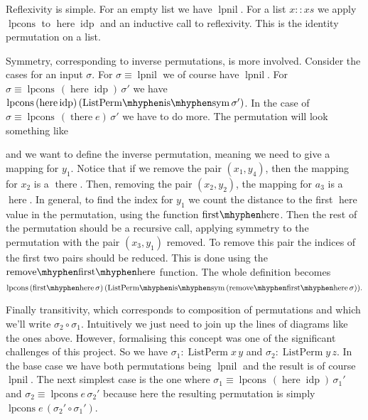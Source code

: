 \documentclass[12pt, parskip, DIV=14]{scrbook}
\renewcommand{\circ}{\vysmwhtcircle}
\newcommand{\idp}{\operatorname{idp}}
\newcommand{\here}{\operatorname{here}}
\newcommand{\there}{\operatorname{there}}
\newcommand{\firsthere}{\operatorname{first\mhyphen here}}
\newcommand{\remfirsthere}{\operatorname{remove\mhyphen first\mhyphen here}}
\newcommand{\ListPerm}{\operatorname{ListPerm}}
\newcommand{\lpnil}{\operatorname{lpnil}}
\newcommand{\lpcons}{\operatorname{lpcons}}
\begin{document}
Reflexivity is simple. For an empty list we have $\lpnil$. For a list $x :: xs$ we apply $\lpcons$ to $\here \idp$ and an inductive call to reflexivity. This is the identity permutation on a list.

Symmetry, corresponding to inverse permutations, is more involved. Consider the cases for an input $\sigma$. For $\sigma \equiv \lpnil$ we of course have $\lpnil$. For $\sigma \equiv \lpcons\,(\here \idp)\,\sigma'$ we have $\lpcons\,(\here \idp)\,(\mathrm{ListPerm\mhyphen is\mhyphen sym}\,\sigma')$. In the case of $\sigma \equiv \lpcons\,(\there e)\,\sigma'$ we have to do more. The permutation will look something like
\begin{center}
\end{center}
and we want to define the inverse permutation, meaning we need to give a mapping for $y_1$. Notice that if we remove the pair $(x_1 , y_4)$, then the mapping for $x_2$ is a $\there$. Then, removing the pair $(x_2 , y_2)$, the mapping for $a_3$ is a $\here$. In general, to find the index for $y_1$ we count the distance to the first $\here$ value in the permutation, using the function $\firsthere$. Then the rest of the permutation should be a recursive call, applying symmetry to the permutation with the pair $(x_3 , y_1)$ removed. To remove this pair the indices of the first two pairs should be reduced. This is done using the $\remfirsthere$ function. The whole definition becomes $$\lpcons\,(\firsthere \sigma)\,(\mathrm{ListPerm\mhyphen is\mhyphen sym}\,(\remfirsthere \sigma)).$$

Finally transitivity, which corresponds to composition of permutations and which we'll write $\sigma_2 \circ \sigma_1$. Intuitively we just need to join up the lines of diagrams like the ones above. However, formalising this concept was one of the significant challenges of this project. So we have $\sigma_1 : \ListPerm x\,y$ and $\sigma_2 : \ListPerm y\,z$. In the base case we have both permutations being $\lpnil$ and the result is of course $\lpnil$. The next simplest case is the one where $\sigma_1 \equiv \lpcons\,(\here \idp)\,\sigma_1'$ and $\sigma_2 \equiv \lpcons e\,\sigma_2'$ because here the resulting permutation is simply $\lpcons e\,(\sigma_2' \circ \sigma_1')$.
\end{document}
